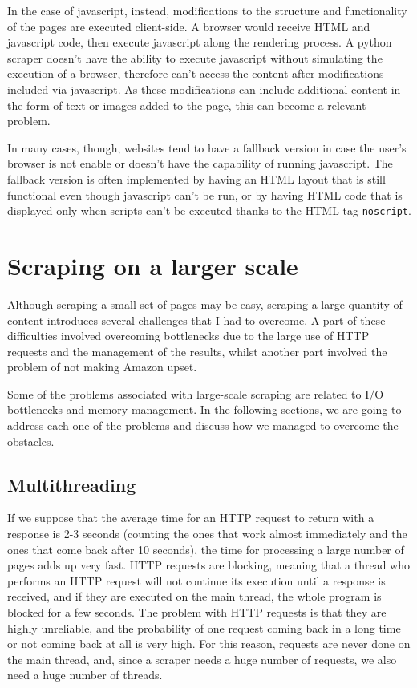 \documentclass[LaM,oneside,binding=0.6cm]{sapthesis}
\begin{document}
In the case of javascript, instead, modifications to the structure and functionality of the pages are executed client-side. A browser would receive HTML and javascript code, then execute javascript along the rendering process. A python scraper doesn't have the ability to execute javascript without simulating the execution of a browser, therefore can't access the content after modifications included via javascript. As these modifications can include additional content in the form of text or images added to the page, this can become a relevant problem.

In many cases, though, websites tend to have a fallback version in case the user's browser is not enable or doesn't have the capability of running javascript. The fallback version is often implemented by having an HTML layout that is still functional even though javascript can't be run, or by having HTML code that is displayed only when scripts can't be executed thanks to the HTML tag \texttt{noscript}.

\section{Scraping on a larger scale}

Although scraping a small set of pages may be easy, scraping a large quantity of content introduces several challenges that I had to overcome. A part of these difficulties involved overcoming bottlenecks due to the large use of HTTP requests and the management of the results, whilst another part involved the problem of not making Amazon upset.

Some of the problems associated with large-scale scraping are related to I/O bottlenecks and memory management. In the following sections, we are going to address each one of the problems and discuss how we managed to overcome the obstacles.

\subsection{Multithreading}

If we suppose that the average time for an HTTP request to return with a response is 2-3 seconds (counting the ones that work almost immediately and the ones that come back after 10 seconds), the time for processing a large number of pages adds up very fast. HTTP requests are blocking, meaning that a thread who performs an HTTP request will not continue its execution until a response is received, and if they are executed on the main thread, the whole program is blocked for a few seconds. The problem with HTTP requests is that they are highly unreliable, and the probability of one request coming back in a long time or not coming back at all is very high. For this reason, requests are never done on the main thread, and, since a scraper needs a huge number of requests, we also need a huge number of threads.
\end{document}
